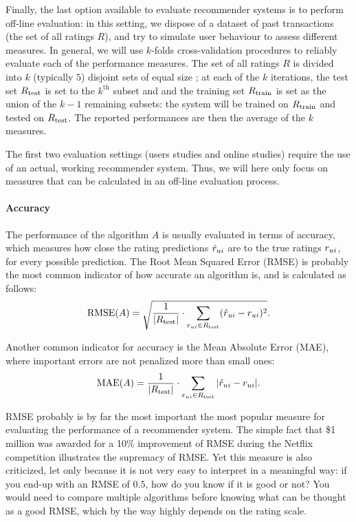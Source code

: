 Finally, the last option available to evaluate recommender systems is to
perform off-line evaluation: in this setting, we dispose of a dataset of past
transactions (the set of all ratings $R$), and try to simulate user behaviour
to assess different measures.  In general, we will use $k$-folds
cross-validation procedures to reliably evaluate each of the performance
measures. The set of all ratings $R$ is divided into $k$ (typically $5$)
disjoint sets of equal size ; at each of the $k$ iterations, the test set
$R_{\text{test}}$ is set to the $k^{\text{th}}$ subset and and the training set
$R_{\text{train}}$ is set as the union of the $k - 1$ remaining subsets: the system will
be trained on $R_{\text{train}}$ and tested on $R_{\text{test}}$. The reported performances are
then the average of the $k$ measures.

The first two evaluation settings (users studies and online studies) require
the use of an actual, working recommender system. Thus, we will here only focus
on measures that can be calculated in an off-line evaluation process.

\paragraph{Accuracy\\}
The performance of the algorithm $A$ is usually evaluated in terms of accuracy,
which measures how close the rating predictions $\hat{r}_{ui}$ are to the true
ratings $r_{ui}$, for every possible prediction. The Root Mean Squared Error
(RMSE) is probably the most common indicator of how accurate an algorithm is,
and is calculated as follows:
$$\text{RMSE}(A) = \sqrt{\frac{1}{|R_{\text{test}}|} \cdot \sum_{r_{ui} \in
R_{\text{test}}}(\hat{r}_{ui} - r_{ui})^2}.$$

Another common indicator for accuracy is the Mean Absolute Error (MAE), where
important errors are not penalized more than small ones:
$$\text{MAE}(A) = \frac{1}{|R_{\text{test}}|} \cdot \sum_{r_{ui} \in R_{\text{test}}}|\hat{r}_{ui} -
r_{ui}|.$$

RMSE probably is by far the most important the most popular measure for
evaluating the performance of a recommender system. The simple fact that \$1
million was awarded for a 10\% improvement of RMSE during the Netflix competition
illustrates the supremacy of RMSE. Yet this measure is also criticized, let
only because it is not very easy to interpret in a meaningful way: if you
end-up with an RMSE of $0.5$, how do you know if it is good or not? You would
need to compare multiple algorithms before knowing what can be thought as a
good RMSE, which by the way highly depends on  the rating scale.

